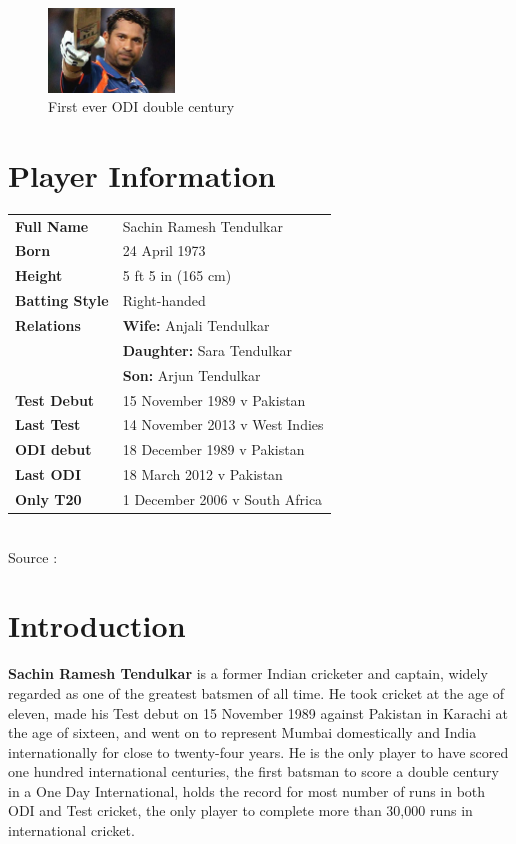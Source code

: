 \documentclass{article}
\begin{document}
\newpage
{}
{
\begin{figure}
\vspace{-100pt}
\begin{center}
\includegraphics[width=0.3\textwidth]{sachin2.jpg}
\caption{First ever ODI double century}
\end{center}
\end{figure}
\section{Player Information}
\begin{tabular}{l l}
\textbf{Full Name} & Sachin Ramesh Tendulkar \\
\textbf{Born} & 24 April 1973 \\
\textbf{Height} & 5 ft 5 in (165 cm) \\
\textbf{Batting Style} & Right-handed \\
\textbf{Relations} & \textbf{Wife: } Anjali Tendulkar \\
& \textbf{Daughter: }  Sara Tendulkar \\
& \textbf{Son: } Arjun Tendulkar \\
\textbf{Test Debut} & 15 November 1989 v Pakistan \\
\textbf{Last Test} & 14 November 2013 v West Indies \\
\textbf{ODI debut} & 18 December 1989 v Pakistan \\
\textbf{Last ODI} & 18 March 2012 v Pakistan \\
\textbf{Only T20} & 1 December 2006 v South Africa \\
\end{tabular}
}
\newline \\
Source : \cite{wiki}

\section{Introduction}
\textbf{Sachin Ramesh Tendulkar} is a former Indian cricketer and captain, widely regarded as one of the greatest batsmen of all time. He took cricket  at the age of eleven, made his Test  debut  on 15 November 1989 against Pakistan in Karachi at the age of sixteen, and went on to represent Mumbai domestically and India internationally for close to twenty-four years. He is the only player to have scored one hundred international  centuries, the first  batsman to score a double century in a  One Day International, holds the  record for most number of  runs in both ODI and  Test cricket, the only player to complete more than 30,000 runs in international cricket. \cite{wiki} \\
\end{document}
